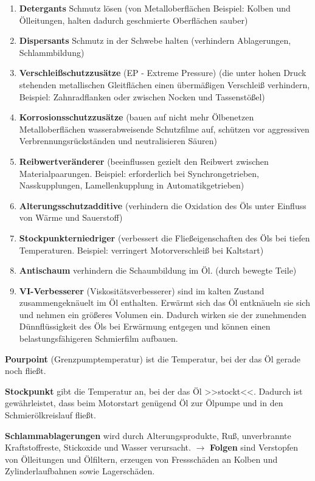\begin{enumerate}
\item
  \textbf{Detergants} Schmutz lösen (von Metalloberflächen Beispiel:
  Kolben und Ölleitungen, halten dadurch geschmierte Oberflächen sauber)
\item
  \textbf{Dispersants} Schmutz in der Schwebe halten (verhindern
  Ablagerungen, Schlammbildung)
\item
  \textbf{Verschleißschutzzusätze} (EP - Extreme Pressure) (die unter
  hohen Druck stehenden metallischen Gleitflächen einen übermäßigen
  Verschleiß verhindern, Beispiel: Zahnradflanken oder zwischen Nocken
  und Tassenstößel)
\item
  \textbf{Korrosionsschutzzusätze} (bauen auf nicht mehr Ölbenetzen
  Metalloberflächen wasserabweisende Schutzfilme auf, schützen vor
  aggressiven Verbrennungsrückständen und neutralisieren Säuren)
\item
  \textbf{Reibwertveränderer} (beeinflussen gezielt den Reibwert
  zwischen Materialpaarungen. Beispiel: erforderlich bei
  Synchrongetrieben, Nasskupplungen, Lamellenkupplung in
  Automatikgetrieben)
\item
  \textbf{Alterungsschutzadditive} (verhindern die Oxidation des Öls
  unter Einfluss von Wärme und Sauerstoff)
\item
  \textbf{Stockpunkterniedriger} (verbessert die Fließeigenschaften des
  Öls bei tiefen Temperaturen. Beispiel: verringert Motorverschleiß bei
  Kaltstart)
\item
  \textbf{Antischaum} verhindern die Schaumbildung im Öl. (durch bewegte
  Teile)
\item
  \textbf{VI-Verbesserer} (Viskositätsverbesserer) sind im kalten
  Zustand zusammengeknäuelt im Öl enthalten. Erwärmt sich das Öl
  entknäueln sie sich und nehmen ein größeres Volumen ein. Dadurch
  wirken sie der zunehmenden Dünnflüssigkeit des Öls bei Erwärmung
  entgegen und können einen belastungsfähigeren Schmierfilm aufbauen.
\end{enumerate}

\textbf{Pourpoint} (Grenzpumptemperatur) ist die Temperatur, bei der das
Öl gerade noch fließt.

\textbf{Stockpunkt} gibt die Temperatur an, bei der das Öl >>stockt<<.
Dadurch ist gewährleistet, dass beim Motorstart genügend Öl zur Ölpumpe
und in den Schmierölkreislauf fließt.

\textbf{Schlammablagerungen} wird durch Alterungsprodukte, Ruß,
unverbrannte Kraftstoffreste, Stickoxide und Wasser verursacht. $\to$
\textbf{Folgen} sind Verstopfen von Ölleitungen und Ölfiltern, erzeugen
von Fressschäden an Kolben und Zylinderlaufbahnen sowie Lagerschäden.

